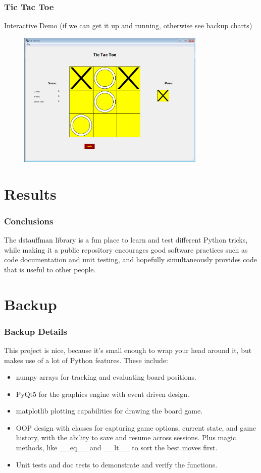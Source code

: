 \documentclass{beamer}
\begin{document}
\begin{frame}
    \frametitle{Tic Tac Toe}
    Interactive Demo (if we can get it up and running, otherwise see backup charts)
    \begin{figure}
        \centering
        \includegraphics[width=0.8\textwidth]{TicTacToe_Board.png}
    \end{figure}
\end{frame}

\section{Results}
\begin{frame}
    \frametitle{Conclusions}
    The dstauffman library is a fun place to learn and test different Python tricks, while making it a public repository encourages good software practices such as code documentation and unit testing, and hopefully simultaneously provides code that is useful to other people.
\end{frame}

\section{Backup}
\frame{\sectionpage}

\begin{frame}
    \frametitle{Backup Details}
    This project is nice, because it's small enough to wrap your head around it, but makes use of a lot of Python features.  These include:
    \begin{itemize}
        \item numpy arrays for tracking and evaluating board positions.
        \item PyQt5 for the graphics engine with event driven design.
        \item matplotlib plotting capabilities for drawing the board game.
        \item OOP design with classes for capturing game options, current state, and game history, with the ability to save and resume across sessions.  Plus magic methods, like \_\_eq\_\_ and \_\_lt\_\_  to sort the best moves first.
        \item Unit tests and doc tests to demonstrate and verify the functions.
    \end{itemize}
\end{frame}
\end{document}
